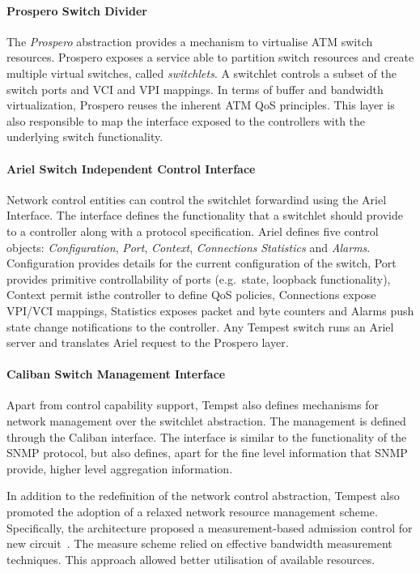 \paragraph{Prospero Switch Divider} 

The {\it Prospero} abstraction provides a mechanism to virtualise ATM switch
resources. Prospero exposes a service able to partition switch resources and
create multiple virtual switches, called {\it switchlets}. A switchlet controls
a subset of the switch ports and VCI and VPI mappings. In terms of buffer and
bandwidth virtualization, Prospero reuses the inherent ATM QoS principles. This
layer is also responsible to map the interface exposed to the controllers with
the underlying switch functionality. 

\paragraph{Ariel Switch Independent Control Interface} 

Network control entities can control the switchlet forwardind using the Ariel
Interface. The interface defines the functionality that a switchlet should
provide to a controller along with a protocol specification. Ariel defines five
control objects: {\it Configuration}, {\it Port}, {\it Context}, {\it
  Connections} {\it Statistics} and {\it Alarms}.  Configuration provides
details for the current configuration of the switch, Port provides primitive
controllability of ports (e.g.~state, loopback functionality), Context permit
isthe controller to define QoS policies, Connections expose VPI/VCI mappings,
Statistics exposes packet and byte counters and Alarms push state change
notifications to the controller. Any Tempest switch runs an Ariel server and
translates Ariel request to the Prospero layer. 

\paragraph{Caliban Switch Management Interface}

Apart from control capability support, Tempst also defines mechanisms for
network management over the switchlet abstraction. The management is defined
through the Caliban interface. The interface is similar to the functionality of
the SNMP protocol, but also defines, apart for the fine level information that
SNMP provide, higher level aggregation information. 

In addition to the redefinition of the network control abstraction, Tempest also
promoted the adoption of a relaxed network resource management scheme.
Specifically, the architecture proposed a measurement-based admission control
for new circuit~\cite{Lewis1998}. The measure scheme relied on effective
bandwidth measurement techniques. This approach allowed better utilisation of
available resources. 

